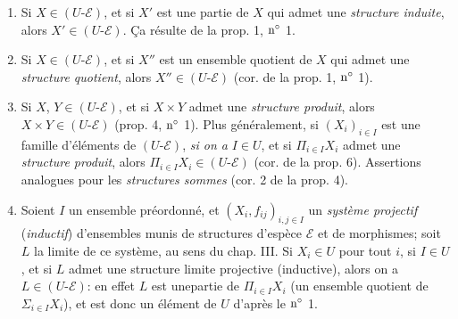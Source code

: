 \begin{enumerate}
\renewcommand{\theenumi}{\alph{enumi}}
\renewcommand{\labelenumi}{\theenumi)}
\item Si $X\in(U\text{-}\mathcal{E})$, et si $X'$ est une partie de $X$ qui
admet une \emph{structure induite}, alors $X'\in
(U\text{-}\mathcal{E})$. \c Ca résulte de la prop. 1, ${\rm
n^{\circ}}$ 1.

\item Si $X\in (U\text{-}\mathcal{E})$, et si $X''$ est un ensemble quotient de
$X$ qui admet une \emph{structure quotient}, alors $X''\in
(U\text{-}\mathcal{E})$ (cor. de la prop. 1, ${\rm n^{\circ}}$ 1).

\item Si $X$, $Y\in (U\text{-}\mathcal{E})$, et si $X\times Y$ admet une
\emph{structure produit}, alors $X\times Y\in
(U\text{-}\mathcal{E})$ (prop. 4, ${\rm n^{\circ}}$ 1). Plus
généralement, si $(X_i)_{i\in I}$ est une famille d'éléments de
$(U\text{-}\mathcal{E})$, \emph{si on a} $I\in U$, et si $\Pi_{i\in
I}X_i$ admet une \emph{structure produit}, alors $\Pi_{i\in I}X_i
\in (U\text{-}\mathcal{E})$ (cor. de la prop. 6). Assertions
analogues pour les \emph{structures sommes} (cor. 2 de la prop. 4).

\item Soient $I$ un ensemble préordonné, et $(X_i, f_{ij})_{i,j\in
I}$ un \emph{système projectif} (\resp \emph{inductif}) d'ensembles
munis de structures d'espèce $\mathcal{E}$ et de morphismes; soit
$L$ la limite de ce système, au sens du chap. III. Si $X_i\in U$
pour tout $i$, si $I\in U$, et si $L$ admet une structure limite
projective (\resp inductive), alors on a $L\in
(U\text{-}\mathcal{E})$: en effet $L$ est une\pageoriginale partie
de $\Pi_{i\in I}X_i$ (\resp un ensemble quotient de $\Sigma_{i\in
I}X_i$), et est donc un élément de $U$ d'après le ${\rm n^{\circ}}$
1.
\end{enumerate}

